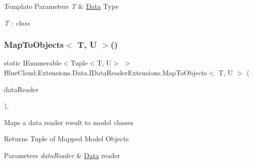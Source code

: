 \begin{DoxyTemplParams}{Template Parameters}
{\em T} & \mbox{\hyperlink{namespace_blue_cloud_1_1_extensions_1_1_data}{Data}} Type\\
\hline
\end{DoxyTemplParams}
\begin{Desc}
\item[Type Constraints]\begin{description}
\item[{\em T} : {\em class}]\end{description}
\end{Desc}
\mbox{\label{class_blue_cloud_1_1_extensions_1_1_data_1_1_i_data_reader_extensions_af125bc42a7dc02955ce4322f138c8648}} 
\subsubsection{\texorpdfstring{Map\+To\+Objects$<$ T, U $>$()}{MapToObjects< T, U >()}\hspace{0.1cm}{\footnotesize\ttfamily [1/2]}}
{\footnotesize\ttfamily static I\+Enumerable$<$Tuple$<$T, U$>$ $>$ Blue\+Cloud.\+Extensions.\+Data.\+I\+Data\+Reader\+Extensions.\+Map\+To\+Objects$<$ T, U $>$ (\begin{DoxyParamCaption}\item[{this I\+Data\+Reader}]{data\+Reader }\end{DoxyParamCaption})\hspace{0.3cm}{\ttfamily [inline]}, {\ttfamily [static]}}



Maps a data reader result to model classes 

\begin{DoxyReturn}{Returns}
Tuple of Mapped Model Objects
\end{DoxyReturn}

\begin{DoxyParams}{Parameters}
{\em data\+Reader} & \mbox{\hyperlink{namespace_blue_cloud_1_1_extensions_1_1_data}{Data}} reader\\
\hline
\end{DoxyParams}

